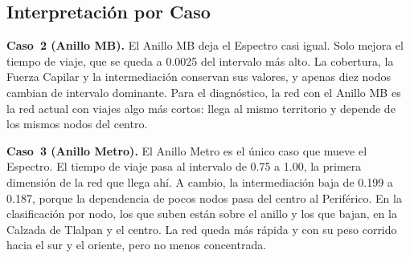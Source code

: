 \subsection{Interpretación por Caso}
\label{subsec:anillo-espectro-interpretacion}

\textbf{Caso~2 (Anillo MB).} El Anillo MB deja el Espectro casi igual. Solo
mejora el tiempo de viaje, que se queda a 0.0025 del intervalo más alto. La
cobertura, la Fuerza Capilar y la intermediación conservan sus valores, y
apenas diez nodos cambian de intervalo dominante. Para el diagnóstico, la red con
el Anillo MB es la red actual con viajes algo más cortos: llega al mismo
territorio y depende de los mismos nodos del centro.

\textbf{Caso~3 (Anillo Metro).} El Anillo Metro es el único caso que mueve el
Espectro. El tiempo de viaje pasa al intervalo de 0.75 a 1.00, la primera
dimensión de la red que llega ahí. A cambio, la intermediación baja de 0.199 a
0.187, porque la dependencia de pocos nodos pasa del centro al Periférico. En
la clasificación por nodo, los que suben están sobre el anillo y los que bajan,
en la Calzada de Tlalpan y el centro. La red queda más rápida y con su peso
corrido hacia el sur y el oriente, pero no menos concentrada.
